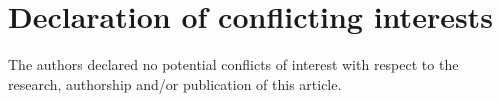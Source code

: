 \documentclass[submit]{smj}
\begin{document}


\section*{Declaration of conflicting interests}
The authors declared no potential conflicts of interest with respect to the research, authorship and/or
publication of this article.




\appendix
\end{document}
